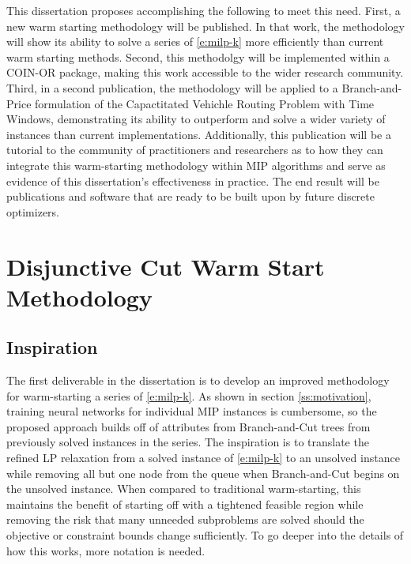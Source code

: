 \documentclass[10pt]{article}
\begin{document}
	This dissertation proposes accomplishing the following to meet this need. First, a new warm starting methodology will be published. In that work, the methodology will show its ability to solve a series of \ref{e:milp-k} more efficiently than current warm starting methods. Second, this methodolgy will be implemented within a COIN-OR package, making this work accessible to the wider research community. Third, in a second publication, the methodology will be applied to a Branch-and-Price formulation of the Capactitated Vehichle Routing Problem with Time Windows, demonstrating its ability to outperform and solve a wider variety of instances than current implementations. Additionally, this publication will be a tutorial to the community of practitioners and researchers as to how they can integrate this warm-starting methodology within MIP algorithms and serve as evidence of this dissertation's effectiveness in practice. The end result will be publications and software that are ready to be built upon by future discrete optimizers.
	
	\section{Disjunctive Cut Warm Start Methodology}
	
	\subsection{Inspiration} \label{ss:inspiration}
	The first deliverable in the dissertation is to develop an improved methodology for warm-starting a series of \ref{e:milp-k}. As shown in section \ref{ss:motivation}, training neural networks for individual MIP instances is cumbersome, so the proposed approach builds off of attributes from Branch-and-Cut trees from previously solved instances in the series. The inspiration is to translate the refined LP relaxation from a solved instance of \ref{e:milp-k} to an unsolved instance while removing all but one node from the queue when Branch-and-Cut begins on the unsolved instance. When compared to traditional warm-starting, this maintains the benefit of starting off with a tightened feasible region while removing the risk that many unneeded subproblems are solved should the objective or constraint bounds change sufficiently. To go deeper into the details of how this works, more notation is needed.
	
\end{document}

